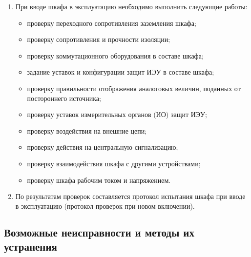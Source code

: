 \begin{enumerate}[label=\arabic{section}.\arabic{subsection}.\arabic*, align=left, labelsep=4pt, leftmargin=0pt, itemindent=2cm]

\item
При вводе шкафа в эксплуатацию необходимо выполнить следующие работы:
\begin{itemize}
\item проверку переходного сопротивления заземления шкафа;
\item проверку сопротивления и прочности изоляции;
\item проверку коммутационного оборудования в составе шкафа;
\item задание уставок и конфигурации защит ИЭУ в составе шкафа;
\item проверку правильности отображения аналоговых величин, поданных от постороннего источника;
\item проверку уставок измерительных органов (ИО) защит ИЭУ;
\item проверку воздействия на внешние цепи;
\item проверку действия на центральную сигнализацию;
\item проверку взаимодействия шкафа с другими устройствами;
\item проверку шкафа рабочим током и напряжением.
\end{itemize}

\item
По результатам проверок составляется протокол испытания шкафа при вводе в эксплуатацию (протокол проверок при новом включении).

\end{enumerate}

\color{unidarkgreen}\subsection{Возможные неисправности и методы их устранения}\color{black}

